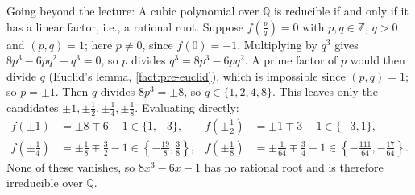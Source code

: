 \begin{content}
\begin{center}
\end{center}

\begin{steps}
Going beyond the lecture: A cubic polynomial over $\mathbb{Q}$ is reducible if and only if it has a linear factor, i.e., a rational root. Suppose $f(\frac{p}{q}) = 0$ with $p, q \in \mathbb{Z}$, $q > 0$ and $(p, q) = 1$; here $p \neq 0$, since $f(0) = -1$. Multiplying by $q^3$ gives $8p^3 - 6pq^2 - q^3 = 0$, so $p$ divides $q^3 = 8p^3 - 6pq^2$. A prime factor of $p$ would then divide $q$ (Euclid's lemma, \cref{fact:pre-euclid}), which is impossible since $(p, q) = 1$; so $p = \pm 1$. Then $q$ divides $8p^3 = \pm 8$, so $q \in \{1, 2, 4, 8\}$. This leaves only the candidates $\pm 1, \pm \frac{1}{2}, \pm \frac{1}{4}, \pm \frac{1}{8}$. Evaluating directly:
\begin{align*}
f(\pm 1) &= \pm 8 \mp 6 - 1 \in \{1, -3\}, & f\!\left(\pm \frac{1}{2}\right) &= \pm 1 \mp 3 - 1 \in \{-3, 1\}, \\
f\!\left(\pm \frac{1}{4}\right) &= \pm \frac{1}{8} \mp \frac{3}{2} - 1 \in \left\{-\frac{19}{8}, \frac{3}{8}\right\}, & f\!\left(\pm \frac{1}{8}\right) &= \pm \frac{1}{64} \mp \frac{3}{4} - 1 \in \left\{-\frac{111}{64}, -\frac{17}{64}\right\}.
\end{align*}
None of these vanishes, so $8x^3 - 6x - 1$ has no rational root and is therefore irreducible over $\mathbb{Q}$.
\end{steps}
\end{content}

